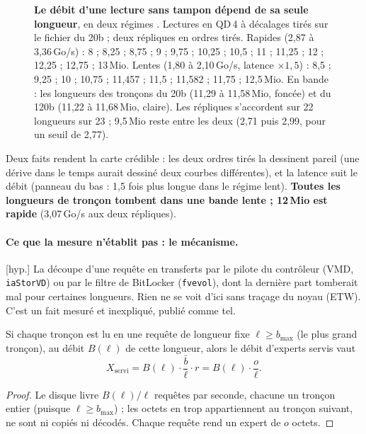 \begin{figure}[ht]
\centering
\GrapheChmLongueurs
\caption[La découverte : le débit selon la longueur de la lecture]{\textbf{Le débit d'une lecture sans tampon dépend de sa seule longueur}, en deux régimes \mes. Lectures en QD\,4 à décalages tirés sur le fichier du 20b ; deux répliques en ordres tirés. Rapides (2,87 à 3,36\,Go/s) : 8 ; 8,25 ; 8,75 ; 9 ; 9,75 ; 10,25 ; 10,5 ; 11 ; 11,25 ; 12 ; 12,25 ; 12,75 ; 13\,Mio. Lentes (1,80 à 2,10\,Go/s, latence $\times 1{,}5$) : 8,5 ; 9,25 ; 10 ; 10,75 ; 11,457 ; 11,5 ; 11,582 ; 11,75 ; 12,5\,Mio. En bande : les longueurs des tronçons du 20b (11,29 à 11,58\,Mio, foncée) et du 120b (11,22 à 11,68\,Mio, claire). Les répliques s'accordent sur 22 longueurs sur 23 ; 9,5\,Mio reste entre les deux (2,71 puis 2,99, pour un seuil de 2,77).}
\label{fig:t2c-longueurs}
\end{figure}

Deux faits rendent la carte crédible : les deux ordres tirés la dessinent pareil (une dérive dans le temps aurait dessiné deux courbes différentes), et la latence suit le débit (panneau du bas : 1,5 fois plus longue dans le régime lent). \textbf{Toutes les longueurs de tronçon tombent dans une bande lente ; 12\,Mio est rapide} (3,07\,Go/s aux deux répliques).

\paragraph{Ce que la mesure n'établit pas : le mécanisme.} [hyp.] La découpe d'une requête en transferts par le pilote du contrôleur (VMD, \texttt{iaStorVD}) ou par le filtre de BitLocker (\texttt{fvevol}), dont la dernière part tomberait mal pour certaines longueurs. Rien ne se voit d'ici sans traçage du noyau (ETW). C'est un fait mesuré et inexpliqué, publié comme tel.

\begin{proposition}\label{prop:t2c-longueur-fixe}
Si chaque tronçon est lu en une requête de longueur fixe $\ell \ge b_{\max}$ (le plus grand tronçon), au débit $B(\ell)$ de cette longueur, alors le débit d'experts servis vaut
\[
X_{\mathrm{servi}} = B(\ell) \cdot \frac{\bar b}{\ell} \cdot r = B(\ell) \cdot \frac{o}{\ell}.
\]
\end{proposition}

\begin{proof}
Le disque livre $B(\ell)/\ell$ requêtes par seconde, chacune un tronçon entier (puisque $\ell \ge b_{\max}$) ; les octets en trop appartiennent au tronçon suivant, ne sont ni copiés ni décodés. Chaque requête rend un expert de $o$ octets.
\end{proof}

